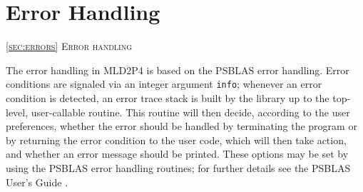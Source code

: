 \section{Error Handling\label{sec:errors}}
         {\textsc{\ref{sec:errors} Error handling}}

The error handling in MLD2P4 is based on the PSBLAS error
handling. Error conditions are signaled via an integer argument
\verb|info|; whenever an error condition is detected, an error trace
stack is built by the library up to the top-level, user-callable
routine. This routine will then decide, according to the user
preferences, whether the error should be handled by terminating the
program or by returning the error condition to the user code, which
will then take action, and whether
an error message should be printed. These options may be set by using
the PSBLAS error handling routines; for further details see the PSBLAS
User's Guide \cite{PSBLASGUIDE}. 

